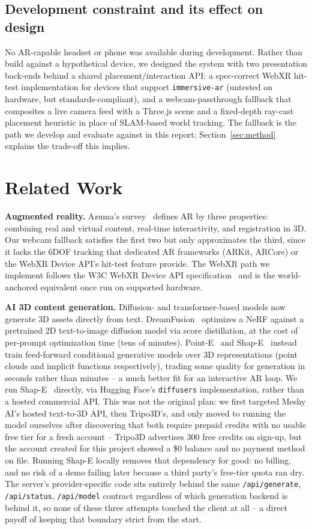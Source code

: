 \documentclass[sigconf,nonacm]{acmart}
\begin{document}
\subsection{Development constraint and its effect on design}
No AR-capable headset or phone was available during development. Rather
than build against a hypothetical device, we designed the system with two
presentation back-ends behind a shared placement/interaction API: a
spec-correct WebXR hit-test implementation for devices that support
\texttt{immersive-ar} (untested on hardware, but standards-compliant), and
a webcam-passthrough fallback that composites a live camera feed with a
Three.js scene and a fixed-depth ray-cast placement heuristic in place of
SLAM-based world tracking. The fallback is the path we develop and
evaluate against in this report; Section~\ref{sec:method} explains the
trade-off this implies.

\section{Related Work}
\label{sec:related}
\textbf{Augmented reality.} Azuma's survey~\cite{azuma1997survey} defines
AR by three properties: combining real and virtual content, real-time
interactivity, and registration in 3D. Our webcam fallback satisfies the
first two but only approximates the third, since it lacks the 6DOF
tracking that dedicated AR frameworks (ARKit, ARCore) or the WebXR Device
API's hit-test feature provide. The WebXR path we implement follows the
W3C WebXR Device API specification~\cite{webxr-spec} and is the
world-anchored equivalent once run on supported hardware.

\textbf{AI 3D content generation.} Diffusion- and transformer-based models
now generate 3D assets directly from text. DreamFusion~\cite{poole2022dreamfusion}
optimizes a NeRF against a pretrained 2D text-to-image diffusion model via
score distillation, at the cost of per-prompt optimization time (tens of
minutes). Point-E~\cite{nichol2022pointe} and Shap-E~\cite{jun2023shape}
instead train feed-forward conditional generative models over 3D
representations (point clouds and implicit functions respectively),
trading some quality for generation in seconds rather than minutes -- a
much better fit for an interactive AR loop. We run Shap-E~\cite{jun2023shape}
directly, via Hugging Face's \texttt{diffusers} implementation, rather
than a hosted commercial API. This was not the original plan: we first
targeted Meshy AI's hosted text-to-3D API, then Tripo3D's, and only moved
to running the model ourselves after discovering that both require
prepaid credits with no usable free tier for a fresh account -- Tripo3D
advertises 300 free credits on sign-up, but the account created for this
project showed a \$0 balance and no payment method on file. Running
Shap-E locally removes that dependency for good: no billing, and no risk
of a demo failing later because a third party's free-tier quota ran dry.
The server's provider-specific code sits entirely behind the same
\texttt{/api/generate}, \texttt{/api/status}, \texttt{/api/model} contract
regardless of which generation backend is behind it, so none of these
three attempts touched the client at all -- a direct payoff of keeping
that boundary strict from the start.
\end{document}

